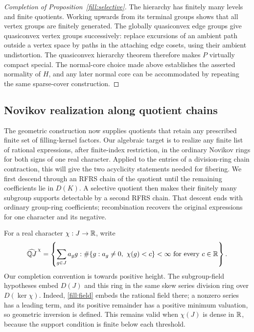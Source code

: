 \begin{proof}[Completion of Proposition~\ref{fill:selective}]
The hierarchy has finitely many levels and finite quotients.
Working upwards from its terminal groups shows that all vertex
groups are finitely generated.  The globally quasiconvex edge
groups give quasiconvex vertex groups successively: replace
excursions of an ambient path outside a vertex space by paths in
the attaching edge cosets, using their ambient undistortion.
The quasiconvex hierarchy theorem \cite{Wise2021} therefore makes
\(P\) virtually compact special.  The normal-core choice made above
establishes the asserted normality of \(H\), and any later normal
core can be accommodated by repeating the same sparse-cover
construction.
\end{proof}

\subsection{Novikov realization along quotient chains}

The geometric construction now supplies quotients that retain any
prescribed finite set of filling-kernel factors. Our algebraic target is
to realize any finite list of rational expressions, after finite-index
restriction, in the ordinary Novikov rings for both signs of one real
character. Applied to the entries of a division-ring chain contraction,
this will give the two acyclicity statements needed for fibering.
We first descend through an RFRS chain of the quotient until the
remaining coefficients lie in \(D(K)\). A selective quotient then
makes their finitely many subgroup supports detectable by a second
RFRS chain. That descent ends with ordinary group-ring coefficients;
recombination recovers the original expressions for one character and
its negative.

For a real character \(\chi:J\to\mathbb R\), write
\begin{equation}
 \widehat{\mathbb Q J}^{\,\chi}
 =\left\{\sum_{g\in J}a_g g:
       \#\{g:a_g\ne0,\ \chi(g)<c\}<\infty
       \text{ for every }c\in\mathbb R\right\}.
 \label{fill:novikov-ring}
\end{equation}
Our completion convention is towards positive height.
The subgroup-field hypotheses embed \(D(J)\) and this ring in the same
skew series division ring over \(D(\ker\chi)\).  Indeed,
\eqref{fill:field} embeds the rational field there; a nonzero series
has a leading term, and its positive remainder has a positive minimum
valuation, so geometric inversion is defined.  This remains valid when
\(\chi(J)\) is dense in \(\mathbb R\), because the support condition is finite
below each threshold.


